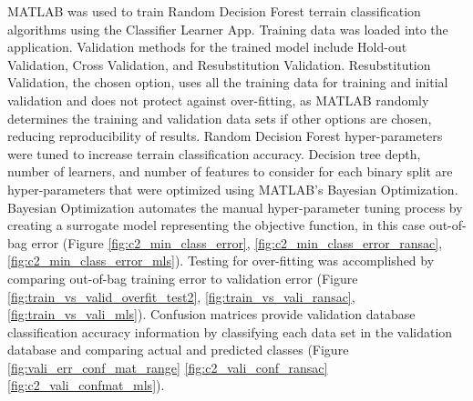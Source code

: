 \documentclass[numbered,pdftex]{ohio-etd}
\begin{document}
{{{		{MATLAB was used to train Random Decision Forest terrain classification algorithms using the Classifier Learner App. Training data was loaded into the application. Validation methods for the trained model include Hold-out Validation, Cross Validation, and Resubstitution Validation. Resubstitution Validation, the chosen option, uses all the training data for training and initial validation and does not protect against over-fitting, as MATLAB randomly determines the training and validation data sets if other options are chosen, reducing reproducibility of results. Random Decision Forest hyper-parameters were tuned to increase terrain classification accuracy. Decision tree depth, number of learners, and number of features to consider for each binary split are hyper-parameters that were optimized using MATLAB's Bayesian Optimization. Bayesian Optimization automates the manual hyper-parameter tuning process by creating a surrogate model representing the objective function, in this case out-of-bag error (Figure \ref{fig:c2_min_class_error}, \ref{fig:c2_min_class_error_ransac}, \ref{fig:c2_min_class_error_mls}). Testing for over-fitting was accomplished by comparing out-of-bag training error to validation error (Figure \ref{fig:train_vs_valid_overfit_test2}, \ref{fig:train_vs_vali_ransac}, \ref{fig:train_vs_vali_mls}). Confusion matrices provide validation database classification accuracy information by classifying each data set in the validation database and comparing actual and predicted classes (Figure \ref{fig:vali_err_conf_mat_range} \ref{fig:c2_vali_conf_ransac} \ref{fig:c2_vali_confmat_mls}).} 
		
}}}
\end{document}
